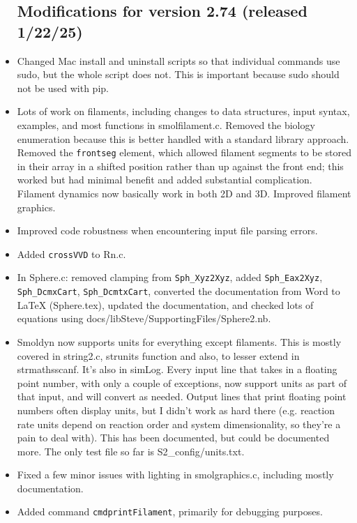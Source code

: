 \documentclass {scrbook}
\newcommand {\ttt} {\texttt}
\begin{document}
\begin{itemize}
\subsection{Modifications for version 2.74 (released 1/22/25)}
\item Changed Mac install and uninstall scripts so that individual commands use sudo, but the whole script does not. This is important because sudo should not be used with pip.
\item Lots of work on filaments, including changes to data structures, input syntax, examples, and most functions in smolfilament.c. Removed the biology enumeration because this is better handled with a standard library approach. Removed the \ttt{frontseg} element, which allowed filament segments to be stored in their array in a shifted position rather than up against the front end; this worked but had minimal benefit and added substantial complication. Filament dynamics now basically work in both 2D and 3D. Improved filament graphics.
\item Improved code robustness when encountering input file parsing errors.
\item Added \ttt{crossVVD} to Rn.c.
\item In Sphere.c: removed clamping from \ttt{Sph\_Xyz2Xyz}, added \ttt{Sph\_Eax2Xyz}, \ttt{Sph\_DcmxCart}, \ttt{Sph\_DcmtxCart}, converted the documentation from Word to LaTeX (Sphere.tex), updated the documentation, and checked lots of equations using docs/\-libSteve/\-SupportingFiles/\-Sphere2.nb.
\item Smoldyn now supports units for everything except filaments. This is mostly covered in string2.c, strunits function and also, to lesser extend in strmathsscanf. It's also in simLog. Every input line that takes in a floating point number, with only a couple of exceptions, now support units as part of that input, and will convert as needed. Output lines that print floating point numbers often display units, but I didn't work as hard there (e.g. reaction rate units depend on reaction order and system dimensionality, so they're a pain to deal with). This has been documented, but could be documented more. The only test file so far is S2\_config/units.txt.
\item Fixed a few minor issues with lighting in smolgraphics.c, including mostly documentation.
\item Added command \ttt{cmdprintFilament}, primarily for debugging purposes.

\end{itemize}
\end{document}
